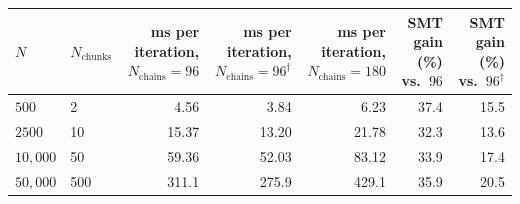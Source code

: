 \begin{table}[H]
{\begin{tabular}{llrrrrr}
$N$ & $N_{\text{chunks}}$ & \makecell[r]{ms per \\ iteration, \\ $N_{\text{chains}} = 96$} & \makecell[r]{ms per \\ iteration, \\ $N_{\text{chains}} = 96^{\dagger}$} & \makecell[r]{ms per \\ iteration, \\ $N_{\text{chains}} = 180$} & \makecell[r]{SMT gain (\%) \\ vs.\ $96$} & \makecell[r]{SMT gain (\%) \\ vs.\ $96^{\dagger}$} \\
\hline
$500$ & 2 & 4.56 & 3.84 & 6.23 & 37.4 & 15.5 \\
$2500$ & 10 & 15.37 & 13.20 & 21.78 & 32.3 & 13.6 \\
$10,000$ & 50 & 59.36 & 52.03 & 83.12 & 33.9 & 17.4 \\
$50,000$ & 500 & 311.1 & 275.9 & 429.1 & 35.9 & 20.5 \\
\hline
\end{tabular}
}
\end{table}
